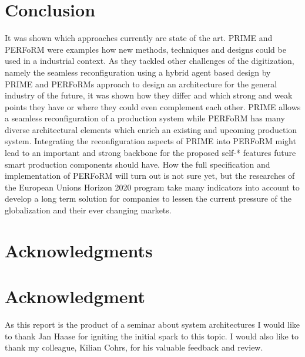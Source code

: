 \documentclass[conference,compsoc,hidelinks]{IEEEtran}
\begin{document}
\section{Conclusion} %
It was shown which approaches currently are state of the art. PRIME and PERFoRM were examples how new methods, techniques and designs could be used in a industrial context. As they tackled other challenges of the digitization, namely the seamless reconfiguration using a hybrid agent based design by PRIME and PERFoRMs approach to design an architecture for the general industry of the future, it was shown how they differ and which strong and weak points they have or where they could even complement each other.
PRIME allows a seamless reconfiguration of a production system while PERFoRM has many diverse architectural elements which enrich an existing and upcoming production system. Integrating the reconfiguration aspects of PRIME into PERFoRM might lead to an important and strong backbone for the proposed self-* features future smart production components should have. How the full specification and implementation of PERFoRM will turn out is not sure yet, but the researches of the European Unions Horizon 2020 program take many indicators into account to develop a long term solution for companies to lessen the current pressure of the globalization and their ever changing markets.

\ifCLASSOPTIONcompsoc
  \section*{Acknowledgments}
\else
  \section*{Acknowledgment}
\fi

As this report is the product of a seminar about system architectures I would like to thank Jan Haase for igniting the initial spark to this topic.
I would also like to thank my colleague, Kilian Cohrs, for his valuable feedback and review. 
\end{document}

